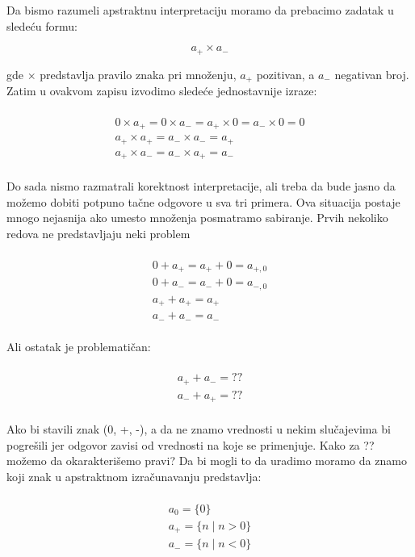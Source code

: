 Da bismo razumeli apstraktnu interpretaciju moramo da prebacimo zadatak u sledeću formu:

\begin{equation}
  a_{+} \times a_{-}
\end{equation}

gde $\times$ predstavlja pravilo znaka pri množenju, $a_{+}$ pozitivan, a $a_{-}$ negativan broj. Zatim u ovakvom zapisu izvodimo sledeće jednostavnije izraze:

\begin{multline} \\
  	0 \times a_{+} = 0 \times a_{-} = a_{+} \times 0 = a_{-} \times 0 = 0 \\
  	a_{+} \times a_{+} = a_{-} \times a_{-} = a_{+} \\
  	a_{+} \times a_{-} = a_{-} \times a_{+} = a_{-} \\
\end{multline}

Do sada nismo razmatrali korektnost interpretacije, ali treba da bude jasno da možemo dobiti potpuno tačne odgovore u sva tri primera. Ova situacija postaje mnogo nejasnija ako umesto množenja posmatramo sabiranje. Prvih nekoliko redova ne pred\-stavljaju neki problem 

\begin{multline} \\
	0 + a_{+} = a_{+} + 0 = a_{+,0} \\ 
	0 + a_{-} = a_{-} + 0 = a_{-,0} \\ 
	a_{+} + a_{+} = a_{+}  \\ 
	a_{-} + a_{-} = a_{-}  \\ 
\end{multline}


Ali ostatak je problematičan:

\begin{multline}	\\
	a_{+} + a_{-} = ?? \\ 
	a_{-} + a_{+} = ?? \\ 
\end{multline}

Ako bi stavili znak (0, +, -), a da ne znamo vrednosti u nekim slu\-čajevima bi pogrešili jer odgovor zavisi od vrednosti na koje se primenjuje. Kako za ?? možemo da okarakterišemo pravi? Da bi mogli to da uradimo moramo da znamo koji znak u apstraktnom izračunavanju predstavlja:

\begin{multline}	\\
	a_{0} = \{0\}				\\    
	a_{+} = \{n \mid n > 0\}		\\	
	a_{-} = \{n \mid n < 0\}		\\
\end{multline}

